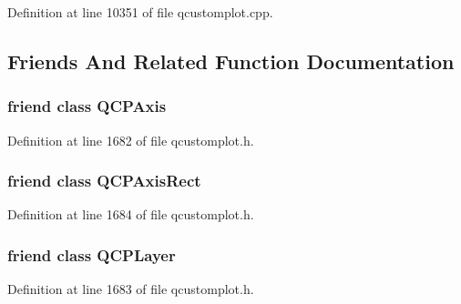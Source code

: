 Definition at line 10351 of file qcustomplot.\-cpp.



\subsection{Friends And Related Function Documentation}
\hypertarget{class_q_custom_plot_af123edeca169ec7a31958a1d714e1a8a}{
\subsubsection[{Q\-C\-P\-Axis}]{\setlength{\rightskip}{0pt plus 5cm}friend class {\bf Q\-C\-P\-Axis}\hspace{0.3cm}{\ttfamily [friend]}}}\label{class_q_custom_plot_af123edeca169ec7a31958a1d714e1a8a}


Definition at line 1682 of file qcustomplot.\-h.

\hypertarget{class_q_custom_plot_acbf20ecb140f66c5fd1bc64ae0762990}{
\subsubsection[{Q\-C\-P\-Axis\-Rect}]{\setlength{\rightskip}{0pt plus 5cm}friend class {\bf Q\-C\-P\-Axis\-Rect}\hspace{0.3cm}{\ttfamily [friend]}}}\label{class_q_custom_plot_acbf20ecb140f66c5fd1bc64ae0762990}


Definition at line 1684 of file qcustomplot.\-h.

\hypertarget{class_q_custom_plot_a5dbf96bf7664c1b6fce49063eeea6eef}{
\subsubsection[{Q\-C\-P\-Layer}]{\setlength{\rightskip}{0pt plus 5cm}friend class {\bf Q\-C\-P\-Layer}\hspace{0.3cm}{\ttfamily [friend]}}}\label{class_q_custom_plot_a5dbf96bf7664c1b6fce49063eeea6eef}


Definition at line 1683 of file qcustomplot.\-h.

